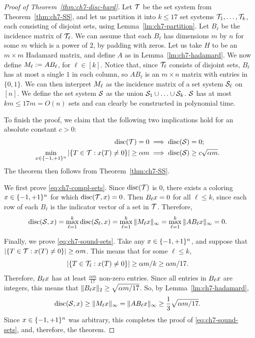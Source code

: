 \begin{proof}[Proof of Theorem~\ref{thm:ch7-disc-hard}]
  Let $\mathcal{T}$ be the set system from Theorem~\ref{thm:ch7-SS}, and let
  us partition it into $k\le 17$ set systems $\mathcal{T}_1, \ldots, \mathcal{T}_k$,
  each consisting of disjoint sets, using
  Lemma~\ref{lm:ch7-partition}. Let $B_\ell$ be the incidence matrix
  of $\mathcal{T}_\ell$. We can assume that each $B_\ell$ has dimensions $m$
  by $n$ for some $m$ which is a power of $2$, by padding with
  zeros. Let us take $H$ to be an $m\times m$ Hadamard matrix, and
  define $A$ as in Lemma~\ref{lm:ch7-hadamard}. We now define $M_\ell := A B_\ell$, for
  $\ell \in [k]$. Notice that, since $\mathcal{T}_\ell$ consists of disjoint
  sets, $B_\ell$ has at most a single $1$ in each column, so
  $A B_\ell$ is an $m\times n$ matrix with entries in $\{0,1\}$. We
  can then interpret $M_\ell$ as the incidence matrix of a set
  system $\mathcal{S}_\ell$ on $[n]$. We define the set system $\mathcal{S}$ as the
  union $\mathcal{S}_1\cup \ldots \cup \mathcal{S}_k$. $\mathcal{S}$ has at most $km \le 17m =
  O(n)$ sets and can clearly be constructed in polynomial time.

  To finish the proof, we claim that the following two implications
  hold for an absolute constant $c > 0$:
  \begin{align}
    \operatorname{disc}(\mathcal{T}) = 0 &\implies \operatorname{disc}(\mathcal{S}) = 0;\label{eq:ch7-compl-sets}\\
    \min_{x \in \{-1,+1\}^n} |\{T \in \mathcal{T}: x(T) \not=  0 \}| \geq \alpha m
                   &\implies \operatorname{disc}(\mathcal{S}) \ge c\sqrt{\alpha m}.\label{eq:ch7-sound-sets}
  \end{align}
  The theorem then follows from Theorem~\ref{thm:ch7-SS}.

  We first prove \eqref{eq:ch7-compl-sets}. Since $\operatorname{disc}(\mathcal{T})$ is $0$,
  there exists a coloring $x \in \{-1,+1\}^n$ for which $\operatorname{disc}(\mathcal{T},
  x) = 0$. Then $B_\ell x = 0$ for all $\ell \le k$, since each
  row of each $B_\ell$ is the indicator vector of a set in $\mathcal{T}$. Therefore,
  \[
    \operatorname{disc}(\mathcal{S},x) = \max_{\ell = 1}^k \operatorname{disc}(\mathcal{S}_\ell,x)
    =
    \max_{\ell=1}^k \|M_\ell x\|_\infty
    =
    \max_{\ell=1}^k \|AB_\ell x\|_\infty = 0.
  \]

  Finally, we prove \eqref{eq:ch7-sound-sets}. Take any $x \in
  \{-1,+1\}^n$, and suppose that $|\{T \in \mathcal{T}: x(T) \not=  0 \}|
  \geq \alpha m$. This means that for some $\ell \le k$,
  \[
    |\{T \in \mathcal{T}_\ell: x(T) \not=  0 \}| \geq \alpha m/k
    \ge \alpha m/17.
  \]
  Therefore, $B_\ell x$ has at least $\frac{\alpha m}{17}$ non-zero
  entries. Since all entries in $B_\ell x$ are integers, this means
  that $\|B_\ell x\|_2 \ge \sqrt{\alpha
      m/17}$. So, by Lemma~\ref{lm:ch7-hadamard},
  \[
    \operatorname{disc}(\mathcal{S},x) \ge \|M_\ell x\|_\infty
    =
    \|AB_\ell x\|_\infty
    \ge \frac13 \sqrt{\alpha m/17}. 
  \]
  Since $x \in \{-1,+1\}^n$ was arbitrary, this completes the proof
  of \eqref{eq:ch7-sound-sets}, 
and,
  therefore, the theorem. 
\end{proof}

